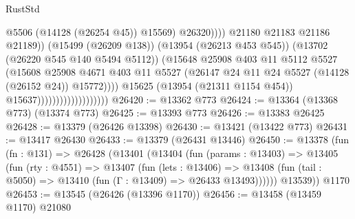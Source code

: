 \begin{lexlean}{RustStd}
\begin{coremodule}
                                                          @5506
                                                          (@14128 (@26254 @45))
                                                          @15569)
                                                        @26320))))
                                                @21180
                                                @21183
                                                @21186
                                                @21189))
                                            (@15499 (@26209 @138))
                                            (@13954 (@26213 @453 @545))
                                            (@13702 (@26220 @545 @140 @5494 @5112))
                                            (@15648
                                              @25908
                                              @403
                                              @11
                                              @5112
                                              @5527
                                              (@15608
                                                @25908
                                                @4671
                                                @403
                                                @11
                                                @5527
                                                (@26147
                                                  @24
                                                  @11
                                                  @24
                                                  @5527
                                                  (@14128 (@26152 @24))
                                                  @15772))))
                                          @15625
                                          (@13954 (@21311 @1154 @454))
                                          @15637)))))))))))))))))))
@26420 := @13362 @773
@26424 := @13364 (@13368 @773) (@13374 @773)
@26425 := @13393 @773
@26426 := @13383 @26425
@26428 := @13379 (@26426 @13398)
@26430 := @13421 (@13422 @773)
@26431 := @13417 @26430
@26433 := @13379 (@26431 @13446)
@26450 := @13378
    (fun (fn : @131) =>
    @26428
      (@13401
        (@13404
          (fun (params : @13403) =>
          @13405
            (fun (rty : @4551) =>
            @13407
              (fun (lets : @13406) =>
              @13408 (fun (tail : @5050) => @13410 (fun (Γ : @13409) => @26433 @13493))))))
        @13539))
    @1170
@26453 := @13545 (@26426 (@13396 @1170))
@26456 := @13458 (@13459 @1170) @21080

\end{coremodule}
\end{lexlean}
